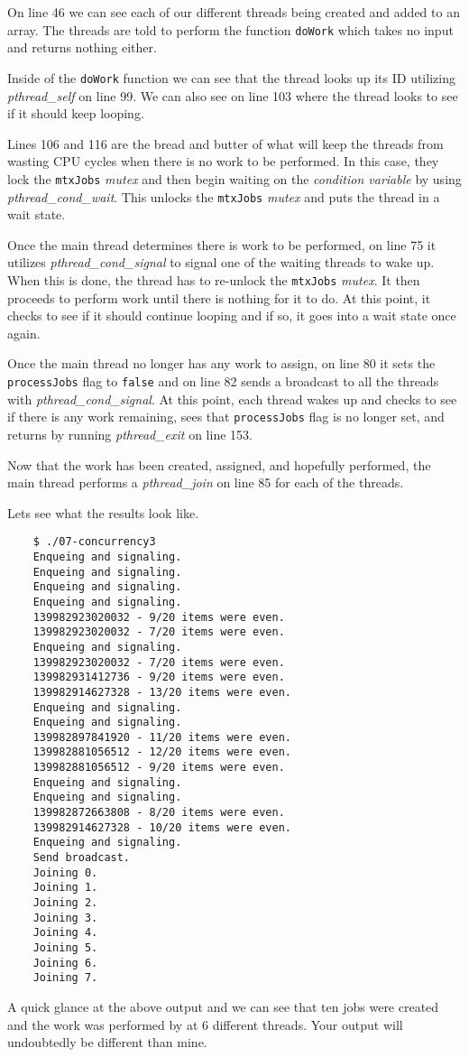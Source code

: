 \documentclass[../main.tex]{subfiles}
\begin{document}
	On line 46 we can see each of our different threads being created and added to an array.  The threads are told to perform the function \texttt{doWork} which takes no input and returns nothing either.
	
	Inside of the \texttt{doWork} function we can see that the thread looks up its ID utilizing \textit{pthread\_self} on line 99.  We can also see on line 103 where the thread looks to see if it should keep looping.
	
	Lines 106 and 116 are the bread and butter of what will keep the threads from wasting CPU cycles when there is no work to be performed.  In this case, they lock the \texttt{mtxJobs} \textit{mutex} and then begin waiting on the \textit{condition variable} by using \textit{pthread\_cond\_wait}.  This unlocks the \texttt{mtxJobs} \textit{mutex} and puts the thread in a wait state.
	
	Once the main thread determines there is work to be performed, on line 75 it utilizes \textit{pthread\_cond\_signal} to signal one of the waiting threads to wake up.  When this is done, the thread has to re-unlock the \texttt{mtxJobs} \textit{mutex}. It then proceeds to perform work until there is nothing for it to do.  At this point, it checks to see if it should continue looping and if so, it goes into a wait state once again.
	
	Once the main thread no longer has any work to assign, on line 80 it sets the \texttt{processJobs} flag to \texttt{false} and on line 82 sends a broadcast to all the threads with \textit{pthread\_cond\_signal}.  At this point, each thread wakes up and checks to see if there is any work remaining, sees that \texttt{processJobs} flag is no longer set, and returns by running \textit{pthread\_exit} on line 153.
	
	Now that the work has been created, assigned, and hopefully performed, the main thread performs a \textit{pthread\_join} on line 85 for each of the threads.
	
	Lets see what the results look like.
	
	\begin{verbatim}
	$ ./07-concurrency3 
	Enqueing and signaling.
	Enqueing and signaling.
	Enqueing and signaling.
	Enqueing and signaling.
	139982923020032 - 9/20 items were even.
	139982923020032 - 7/20 items were even.
	Enqueing and signaling.
	139982923020032 - 7/20 items were even.
	139982931412736 - 9/20 items were even.
	139982914627328 - 13/20 items were even.
	Enqueing and signaling.
	Enqueing and signaling.
	139982897841920 - 11/20 items were even.
	139982881056512 - 12/20 items were even.
	139982881056512 - 9/20 items were even.
	Enqueing and signaling.
	Enqueing and signaling.
	139982872663808 - 8/20 items were even.
	139982914627328 - 10/20 items were even.
	Enqueing and signaling.
	Send broadcast.
	Joining 0.
	Joining 1.
	Joining 2.
	Joining 3.
	Joining 4.
	Joining 5.
	Joining 6.
	Joining 7.
	\end{verbatim}
	
	A quick glance at the above output and we can see that ten jobs were created and the work was performed by at 6 different threads.  Your output will undoubtedly be different than mine.
\end{document}
